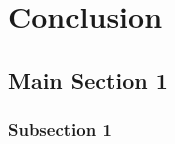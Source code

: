 


\chapter{Conclusion} %

\label{Chapter5} %


\section{Main Section 1}


\subsection{Subsection 1}

